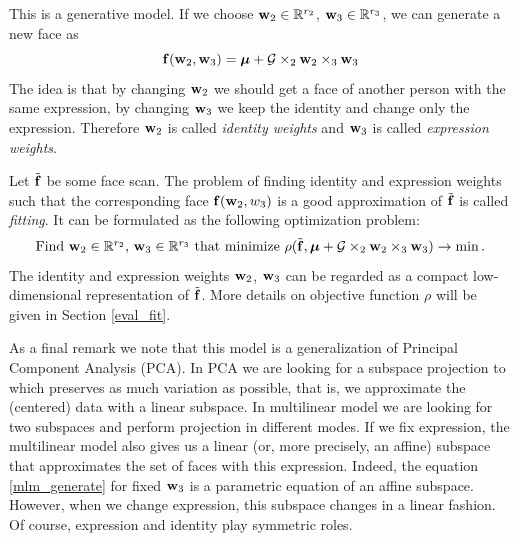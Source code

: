 This is a generative model. If we choose $\mathbf{w}_2 \in \mathbb{R}^{r_2}$,
${\mathbf{w}}_3 \in \mathbb{R}^{r_3}$, we can generate a new face as
\begin{equation}
    \label{mlm_generate}
    {\mathbf{f}}({\mathbf{w}}_2, {\mathbf{w}}_3) = {\boldsymbol{\mu}} +  \mathcal{G} \times_2 {\mathbf{w}}_2 \times_3 {\mathbf{w}}_3
\end{equation}
The idea is that by changing ${\mathbf{w}}_2$ we should get a face of another person
with the same expression, by changing ${\mathbf{w}}_3$ we keep the identity
and change only the expression. Therefore ${\mathbf{w}}_2$ is called \textit{identity weights}
and ${\mathbf{w}}_3$ is called \textit{expression weights}.


Let $\tilde{{\mathbf{f}}}$ be some face scan. The problem of finding
identity and expression weights such that the corresponding face
${\mathbf{f}}({\mathbf{w}}_2, w_3)$ is a good approximation of $\tilde{{\mathbf{f}}}$ is
called  \textit{fitting}. It can be formulated as the following optimization problem:
\begin{equation}
\label{mult_model_fit}
\mbox{Find ${\mathbf{w}}_2 \in \mathbb{R}^{r_2}$, ${\mathbf{w}}_3 \in \mathbb{R}^{r_3}$ that minimize } \rho(\tilde{{\mathbf{f}}}, {\boldsymbol{\mu}} + \mathcal{G} \times_2 {\mathbf{w}}_2 \times_3 {\mathbf{w}}_3) \to \min.
\end{equation}
The identity and expression weights ${\mathbf{w}}_2$, ${\mathbf{w}}_3$ can be regarded as a compact low-dimensional
representation of $\tilde{{\mathbf{f}}}$. More details on  objective function $\rho$ 
will be given in Section \ref{eval_fit}.


As a final remark we note that this model is a generalization of Principal Component 
Analysis (PCA). In PCA we are looking for a subspace projection to which
preserves as much variation as possible, that is, we approximate
the (centered) data with a linear subspace.
In multilinear model we are looking for two subspaces and perform projection
in different modes. If we fix expression, the multilinear model
also gives us a linear (or, more precisely, an affine) subspace that approximates 
the set of faces with  this expression. Indeed,
the equation \eqref{mlm_generate} for fixed ${\mathbf{w}}_3$ is a parametric
equation of an affine subspace. However, when we change
expression, this subspace changes in a linear fashion. Of course,
expression and identity play symmetric roles.

